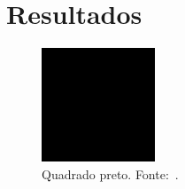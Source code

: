 \chapter{Resultados}%
\label{cap:resultados}%

\begin{figure}[!ht]%
    \centering
    \includegraphics[scale=0.5]{imagens/black-square.png}
    \caption{Quadrado preto. Fonte:~\cite{tortinhas:2024}.}%
    \label{fig:f1}
\end{figure}

\lipsum[1-40] %
